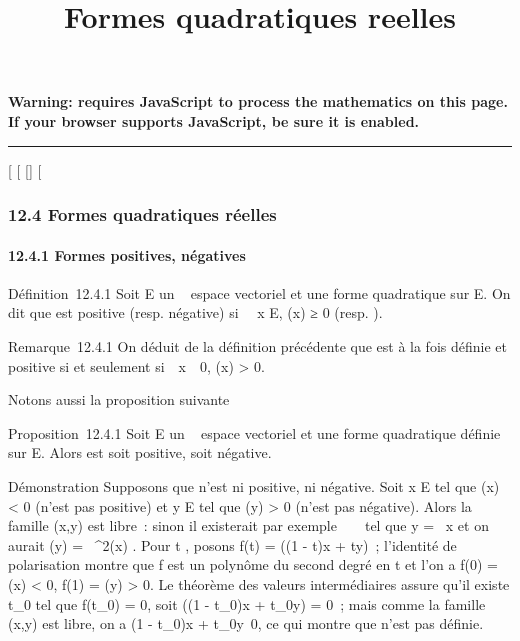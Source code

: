 \documentclass[]{article}
\title{Formes quadratiques reelles}
\author{}
\date{}
\begin{document}
\maketitle

\textbf{Warning: 
requires JavaScript to process the mathematics on this page.\\ If your
browser supports JavaScript, be sure it is enabled.}

\begin{center}\rule{3in}{0.4pt}\end{center}

[
[
[]
[

\subsubsection{12.4 Formes quadratiques réelles}

\paragraph{12.4.1 Formes positives, négatives}

Définition~12.4.1 Soit E un ~ espace vectoriel et \Phi une forme
quadratique sur E. On dit que \Phi est positive (resp. négative) si
\forall~~x \in E, \Phi(x) ≥ 0 (resp. ).

Remarque~12.4.1 On déduit de la définition précédente que \Phi est à la
fois définie et positive si et seulement
si~\forall~x\mathrel\neq~~0, \Phi(x)
> 0.

Notons aussi la proposition suivante

Proposition~12.4.1 Soit E un ~ espace vectoriel et \Phi une forme
quadratique définie sur E. Alors \Phi est soit positive, soit négative.

Démonstration Supposons que \Phi n'est ni positive, ni négative. Soit x \in E
tel que \Phi(x) < 0 (\Phi n'est pas positive) et y \in E tel que \Phi(y)
> 0 (\Phi n'est pas négative). Alors la famille (x,y) est
libre~: sinon il existerait par exemple \lambda~ \in {}~ tel que y = \lambda~x et on
aurait \Phi(y) = \lambda~^2\Phi(x) . Pour t \in [0,1], posons f(t) =
\Phi((1 - t)x + ty)~; l'identité de polarisation montre que f est un
polynôme du second degré en t et l'on a f(0) = \Phi(x) < 0, f(1)
= \Phi(y) > 0. Le théorème des valeurs intermédiaires assure
qu'il existe t_0 \in [0,1] tel que f(t_0) = 0, soit
\Phi((1 - t_0)x + t_0y) = 0~; mais comme la famille (x,y)
est libre, on a (1 - t_0)x +
t_0y\neq~0, ce qui montre que \Phi n'est
pas définie.
\end{document}

